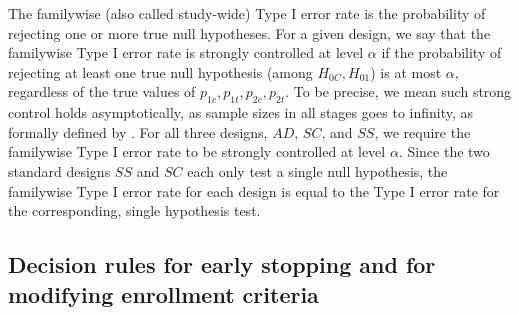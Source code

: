 \documentclass[article]{jss}
\begin{document}
The familywise (also called study-wide) Type I error rate is the probability of rejecting one or more true null hypotheses.
For a given design, we say that the familywise Type I error rate is strongly controlled at level $α$ if the probability of rejecting at least one true null hypothesis (among $H_{0C}, H_{01}$) is at most $α$, regardless of the true values of $p_{1c},p_{1t},p_{2c},p_{2t}$. To be precise, we mean such strong control holds asymptotically, as sample sizes in all stages goes to infinity, as formally defined by \cite{Rosenblum2013AdaptMISTIE}. %
For all three designs, $AD$, $SC$, and $SS$, we require the familywise Type I error rate to be strongly controlled at level $α$. 
Since the two standard designs $SS$ and $SC$ each only test a single null hypothesis, the familywise Type I error rate for each design is equal to the  Type I error rate for the corresponding, single hypothesis test.




\subsection{Decision rules for early stopping and for modifying enrollment criteria}
\label{sub:decisionRules}
\end{document}
